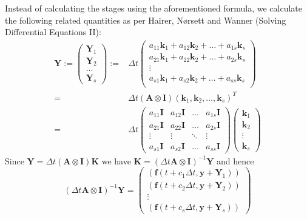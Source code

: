 \documentclass[10pt,a4paper]{article}
\newcommand{\bvec}[1]{\mathbf{#1}}
\begin{document}
Instead of calculating the stages using the aforementioned formula, we calculate the following related quantities as per Hairer, N\o rsett and Wanner (Solving Differential Equations II):
\begin{align*}
  \bvec{Y} := \begin{pmatrix}
    \bvec{Y}_1 \\
    \bvec{Y}_2 \\
    \hdots \\
    \bvec{Y}_s
  \end{pmatrix} :=& \Delta t \begin{pmatrix}
    a_{11} \bvec{k}_1 + a_{12}\bvec{k}_2 + \hdots + a_{1s}\bvec{k}_s \\
    a_{21} \bvec{k}_1 + a_{22}\bvec{k}_2 + \hdots + a_{2s}\bvec{k}_s \\
    \vdots \\
    a_{s1} \bvec{k}_1 + a_{s2}\bvec{k}_2 + \hdots + a_{ss}\bvec{k}_s \\
  \end{pmatrix} \\
  =& \Delta t (\bvec{A}\otimes \bvec{I}) ( \bvec{k}_1, \bvec{k}_2, \hdots, \bvec{k}_s)^T \\
  =& \Delta t \begin{pmatrix}
    a_{11}\bvec{I}  & a_{12}\bvec{I} & \hdots & a_{1s}\bvec{I} \\
    a_{21}\bvec{I}  & a_{22}\bvec{I} & \hdots & a_{2s}\bvec{I} \\
    \vdots & \vdots & \ddots & \vdots \\
    a_{s1}\bvec{I}  & a_{s2}\bvec{I} & \hdots & a_{ss}\bvec{I}
  \end{pmatrix} \begin{pmatrix}
    \bvec{k}_1 \\
    \bvec{k}_2 \\
    \vdots \\
    \bvec{k}_s
  \end{pmatrix}
\end{align*}
Since $\bvec{Y} = \Delta t (\bvec{A}\otimes\bvec{I})\bvec{K}$ we have $\bvec{K} = (\Delta t \bvec{A}\otimes\bvec{I})^{-1}\bvec{Y}$ and hence
\begin{equation}
  (\Delta t \bvec{A}\otimes\bvec{I})^{-1}\bvec{Y} = \begin{pmatrix}
    (\bvec{f}(t+c_1\Delta t, \bvec{y} + \bvec{Y}_1)) \\
    (\bvec{f}(t+c_2\Delta t, \bvec{y} + \bvec{Y}_2)) \\
    \vdots \\
    (\bvec{f}(t+c_s\Delta t, \bvec{y} + \bvec{Y}_s))
  \end{pmatrix}
  \label{eqn:system-solve-1}
\end{equation}
\end{document}
